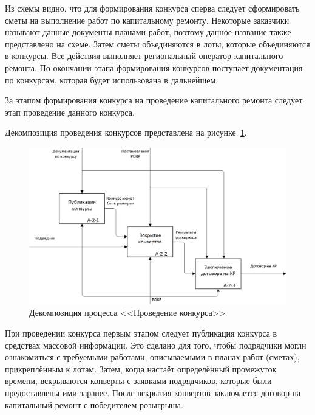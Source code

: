Из схемы видно, что для формирования конкурса сперва следует сформировать сметы на выполнение работ по капитальному ремонту.
Некоторые заказчики называют данные документы планами работ, поэтому данное название также представлено на схеме.
Затем сметы объединяются в лоты, которые объединяются в конкурсы.
Все действия выполняет региональный оператор капитального ремонта.
По окончании этапа формирования конкурсов поступает документация по конкурсам, которая будет использована в дальнейшем.

За этапом формирования конкурса на проведение капитального ремонта следует этап проведение данного конкурса.

Декомпозиция проведения конкурсов представлена на рисунке~\ref{img:source-A2}.

\begin{figure}[h!]
	\begin{center}
		\begin{minipage}[h]{\linewidth}
			\centering
			\includegraphics[width=\linewidth]{images/source-A2.png}
			\caption{Декомпозиция процесса <<Проведение конкурса>>}
			\label{img:source-A2}
		\end{minipage}
		\hfill
	\end{center}
\end{figure}

При проведении конкурса первым этапом следует публикация конкурса в средствах массовой информации.
Это сделано для того, чтобы подрядчики могли ознакомиться с требуемыми работами, описываемыми в планах работ (сметах), прикреплённым к лотам.
Затем, когда настаёт определённый промежуток времени, вскрываются конверты с заявками подрядчиков, которые были предоставлены ими заранее.
После вскрытия конвертов заключается договор на капитальный ремонт с победителем розыгрыша.

